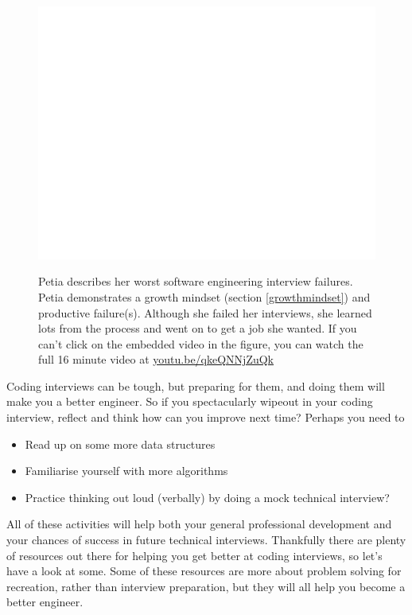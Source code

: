 \documentclass[
]{book}
\providecommand{\tightlist}{%
  \setlength{\itemsep}{0pt}\setlength{\parskip}{0pt}}
\begin{document}
\begin{figure}

{\centering \href{https://www.youtube.com/embed/qkeQNNjZuQk}{\includegraphics[width=0.99\linewidth]{cdyf_files/figure-latex/petia-fig-1} }

}

\caption{Petia describes her worst software engineering interview failures. Petia demonstrates a growth mindset (section \ref{growthmindset}) and productive failure(s). Although she failed her interviews, she learned lots from the process and went on to get a job she wanted. If you can't click on the embedded video in the figure, you can watch the full 16 minute video at \href{https://youtu.be/qkeQNNjZuQk}{youtu.be/qkeQNNjZuQk} \citep{youtube-petia}}\label{fig:petia-fig}
\end{figure}



Coding interviews can be tough, but preparing for them, and doing them will make you a better engineer. So if you spectacularly wipeout in your coding interview, reflect and think how can you improve next time? Perhaps you need to

\begin{itemize}
\tightlist
\item
  Read up on some more data structures
\item
  Familiarise yourself with more algorithms
\item
  Practice thinking out loud (verbally) by doing a mock technical interview?
\end{itemize}

All of these activities will help both your general professional development and your chances of success in future technical interviews. Thankfully there are plenty of resources out there for helping you get better at coding interviews, so let's have a look at some. Some of these resources are more about problem solving for recreation, rather than interview preparation, but they will all help you become a better engineer.
\end{document}
